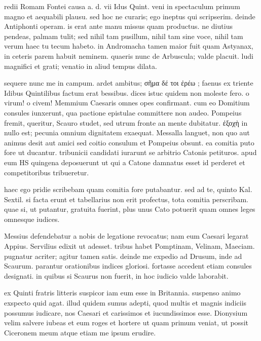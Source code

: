  redii Romam Fontei causa a. d. vii Idus Quint. veni in spectaculum primum magno et aequabili plausu. sed hoc ne curaris; ego ineptus qui scripserim. deinde Antiphonti operam. is erat ante manu missus quam productus. ne diutius pendeas, palmam tulit; sed nihil tam pusillum, nihil tam sine voce, nihil tam verum haec tu tecum habeto. in Andromacha tamen maior fuit quam Astyanax, in ceteris parem habuit neminem. quaeris nunc de Arbuscula; valde placuit. ludi magnifici et grati; venatio in aliud tempus dilata.

 sequere nunc me in campum. ardet ambitus; σῆμα δέ τοι ἐρέω ; faenus ex triente Idibus Quintilibus factum erat bessibus. dices istuc quidem non moleste fero. o virum! o civem! Memmium Caesaris omnes opes confirmant. cum eo Domitium consules iunxerunt, qua pactione epistulae committere non audeo. Pompeius fremit, queritur, Scauro studet, sed utrum fronte an mente dubitatur. ἐξοχὴ in nullo est; pecunia omnium dignitatem exaequat. Messalla languet, non quo aut animus desit aut amici sed coitio consulum et Pompeius obsunt. ea comitia puto fore ut ducantur. tribunicii candidati iurarunt se arbitrio Catonis petituros. apud eum HS quingena deposuerunt ut qui a Catone damnatus esset id perderet et competitoribus tribueretur.

 haec ego pridie scribebam quam comitia fore putabantur. sed ad te, quinto Kal. Sextil. si facta erunt et tabellarius non erit profectus, tota comitia perscribam. quae si, ut putantur, gratuita fuerint, plus unus Cato potuerit quam omnes leges omnesque iudices.

 Messius defendebatur a nobis de legatione revocatus; nam eum Caesari legarat Appius. Servilius edixit ut adesset. tribus habet Pomptinam, Velinam, Maeciam. pugnatur acriter; agitur tamen satis. deinde me expedio ad Drusum, inde ad Scaurum. parantur orationibus indices gloriosi. fortasse accedent etiam consules designati. in quibus si Scaurus non fuerit, in hoc iudicio valde laborabit.

 ex Quinti fratris litteris suspicor iam eum esse in Britannia. suspenso animo exspecto quid agat. illud quidem sumus adepti, quod multis et magnis indiciis possumus iudicare, nos Caesari et carissimos et iucundissimos esse. Dionysium velim salvere iubeas et eum roges et hortere ut quam primum veniat, ut possit Ciceronem meum atque etiam me ipsum erudire.
